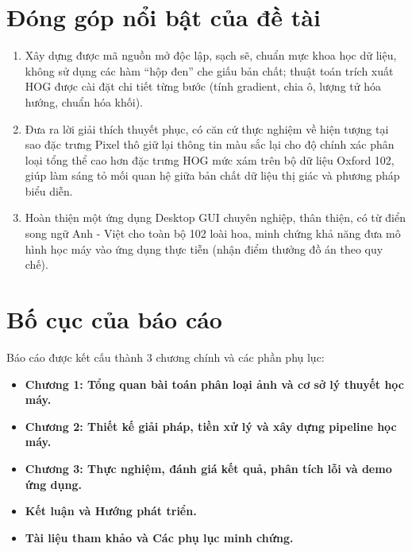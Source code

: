 \documentclass[../DoAn.tex]{subfiles}
\begin{document}
\section{Đóng góp nổi bật của đề tài}
\begin{enumerate}
    \item Xây dựng được mã nguồn mở độc lập, sạch sẽ, chuẩn mực khoa học dữ liệu, không sử dụng các hàm ``hộp đen'' che giấu bản chất; thuật toán trích xuất HOG được cài đặt chi tiết từng bước (tính gradient, chia ô, lượng tử hóa hướng, chuẩn hóa khối).
    \item Đưa ra lời giải thích thuyết phục, có căn cứ thực nghiệm về hiện tượng tại sao đặc trưng Pixel thô giữ lại thông tin màu sắc lại cho độ chính xác phân loại tổng thể cao hơn đặc trưng HOG mức xám trên bộ dữ liệu Oxford 102, giúp làm sáng tỏ mối quan hệ giữa bản chất dữ liệu thị giác và phương pháp biểu diễn.
    \item Hoàn thiện một ứng dụng Desktop GUI chuyên nghiệp, thân thiện, có từ điển song ngữ Anh - Việt cho toàn bộ 102 loài hoa, minh chứng khả năng đưa mô hình học máy vào ứng dụng thực tiễn (nhận điểm thưởng đồ án theo quy chế).
\end{enumerate}

\section{Bố cục của báo cáo}
Báo cáo được kết cấu thành 3 chương chính và các phần phụ lục:
\begin{itemize}
    \item \textbf{Chương 1: Tổng quan bài toán phân loại ảnh và cơ sở lý thuyết học máy.}
    \item \textbf{Chương 2: Thiết kế giải pháp, tiền xử lý và xây dựng pipeline học máy.}
    \item \textbf{Chương 3: Thực nghiệm, đánh giá kết quả, phân tích lỗi và demo ứng dụng.}
    \item \textbf{Kết luận và Hướng phát triển.}
    \item \textbf{Tài liệu tham khảo và Các phụ lục minh chứng.}
\end{itemize}
\end{document}
